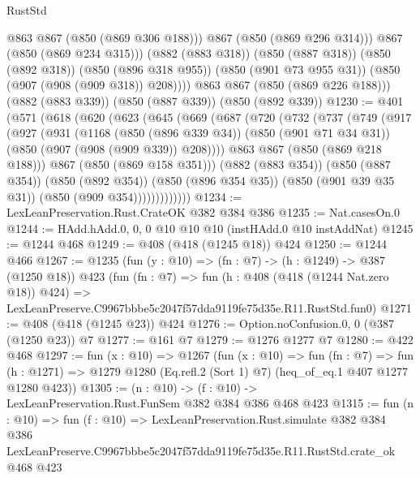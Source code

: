 \begin{lexlean}{RustStd}
\begin{coremodule}
                @863
                @867
                (@850 (@869 @306 @188)))
              @867
              (@850 (@869 @296 @314)))
            @867
            (@850 (@869 @234 @315)))
          (@882 (@883 @318))
          (@850 (@887 @318))
          (@850 (@892 @318))
          (@850 (@896 @318 @955))
          (@850 (@901 @73 @955 @31))
          (@850 (@907 (@908 (@909 @318)) @208))))
      @863
      @867
      (@850 (@869 @226 @188)))
    (@882 (@883 @339))
    (@850 (@887 @339))
    (@850 (@892 @339))
@1230 := @401
    (@571
      (@618
        (@620
          (@623
            (@645
              (@669
                (@687
                  (@720
                    (@732
                      (@737
                        (@749
                          (@917
                            (@927
                              (@931
                                (@1168
                                  (@850 (@896 @339 @34))
                                  (@850 (@901 @71 @34 @31))
                                  (@850 (@907 (@908 (@909 @339)) @208))))
                              @863
                              @867
                              (@850 (@869 @218 @188)))
                            @867
                            (@850 (@869 @158 @351)))
                          (@882 (@883 @354))
                          (@850 (@887 @354))
                          (@850 (@892 @354))
                          (@850 (@896 @354 @35))
                          (@850 (@901 @39 @35 @31))
                          (@850 (@909 @354)))))))))))))
@1234 := LexLeanPreservation.Rust.CrateOK @382 @384 @386
@1235 := Nat.casesOn.{0}
@1244 := HAdd.hAdd.{0, 0, 0} @10 @10 @10 (instHAdd.{0} @10 instAddNat)
@1245 := @1244 @468
@1249 := @408 (@418 (@1245 @18)) @424
@1250 := @1244 @466
@1267 := @1235
    (fun (y : @10) => (fn : @7) -> (h : @1249) -> @387 (@1250 @18))
    @423
    (fun (fn : @7) =>
    fun (h : @408 (@418 (@1244 Nat.zero @18)) @424) =>
    LexLeanPreserve.C9967bbbe5c2047f57dda9119fe75d35e.R11.RustStd.fun0)
@1271 := @408 (@418 (@1245 @23)) @424
@1276 := Option.noConfusion.{0, 0} (@387 (@1250 @23)) @7
@1277 := @161 @7
@1279 := @1276 @1277 @7
@1280 := @422 @468
@1297 := fun (x : @10) =>
  @1267
    (fun (x : @10) =>
    fun (fn : @7) =>
    fun (h : @1271) => @1279 @1280 (Eq.refl.{2} (Sort 1) @7) (heq_of_eq.{1} @407 @1277 @1280 @423))
@1305 := (n : @10) -> (f : @10) -> LexLeanPreservation.Rust.FunSem @382 @384 @386 @468 @423
@1315 := fun (n : @10) =>
  fun (f : @10) =>
  LexLeanPreservation.Rust.simulate
    @382
    @384
    @386
    LexLeanPreserve.C9967bbbe5c2047f57dda9119fe75d35e.R11.RustStd.crate_ok
    @468
    @423
\end{coremodule}
\end{lexlean}
